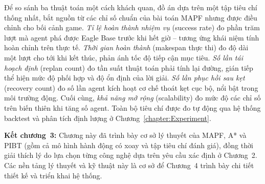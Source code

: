 \documentclass[../DoAn.tex]{subfiles}
\begin{document}
Để so sánh ba thuật toán một cách khách quan, đồ án dựa trên một tập tiêu chí thống nhất, bắt
nguồn từ các chỉ số chuẩn của bài toán MAPF \cite{stern2019mapf} nhưng được điều chỉnh cho bối
cảnh game. \emph{Tỉ lệ hoàn thành nhiệm vụ} (success rate) đo phần trăm lượt mà agent phá được
Eagle Base trước khi hết giờ -- tương ứng khái niệm tính hoàn chỉnh trên thực tế. \emph{Thời gian
hoàn thành} (makespan thực thi) đo độ dài một lượt cho tới khi kết thúc, phản ánh tốc độ tiếp cận
mục tiêu. \emph{Số lần tái hoạch định} (replan count) đo tần suất thuật toán phải tính lại đường,
gián tiếp thể hiện mức độ phối hợp và độ ổn định của lời giải. \emph{Số lần phục hồi sau kẹt}
(recovery count) đo số lần agent kích hoạt cơ chế thoát kẹt cục bộ, nổi bật trong môi trường động.
Cuối cùng, \emph{khả năng mở rộng} (scalability) đo mức độ các chỉ số trên biến thiên khi tăng số
agent. Toàn bộ tiêu chí được đo tự động qua hệ thống backtest và phân tích định lượng ở
Chương~\ref{chapter:Experiment}.

\textbf{Kết chương~3:} Chương này đã trình bày cơ sở lý thuyết của MAPF, A* và PIBT (gồm cả mô
hình hành động có xoay và tập tiêu chí đánh giá), đồng thời giải thích lý do lựa chọn từng công
nghệ dựa trên yêu cầu xác định ở Chương~2. Các nền tảng lý thuyết và kỹ thuật này là cơ sở để
Chương~4 trình bày chi tiết thiết kế và triển khai hệ thống.
\end{document}

